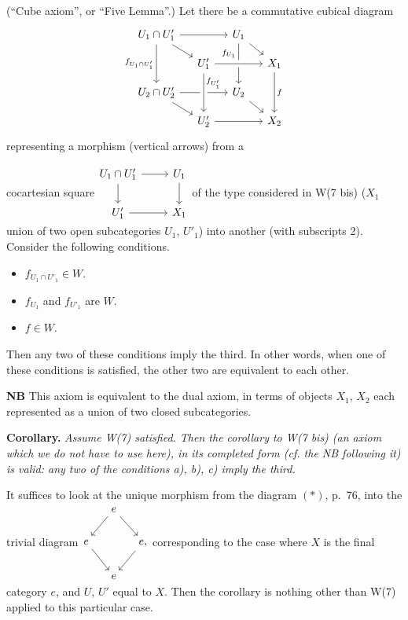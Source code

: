 \begin{description}[leftmargin=5em, style=sameline]
\item[W(7)] (``Cube axiom'', or ``Five Lemma''.) Let there be a commutative cubical diagram
\[
\begin{tikzcd}[row sep=small, column sep=small]
U_1\cap U'_1 \arrow[rr] \arrow[dr] \arrow[dd, "f_{U_1\cap U'_1}"'] & & U_1 \arrow[dr] \arrow[dd, "f_{U_1}"{swap,pos=.25}] & \\
& U'_1 \arrow[rr, crossing over] & & X_1 \arrow[dd, "f"] \\
U_2\cap U'_2 \arrow[rr] \arrow[dr] & & U_2 \arrow[dr] & \\
& U'_2 \arrow[rr] \arrow[from=uu, crossing over, "f_{U'_1}"{pos=.25}] & & X_2
\end{tikzcd}
\]
representing a morphism (vertical arrows) from a

cocartesian square\quad $\vcenter{\hbox{\begin{tikzcd}
U_1\cap U'_1 \arrow[r] \arrow[d] & U_1 \arrow[d] \\
U'_1 \arrow[r] & X_1
\end{tikzcd}}}$\quad of the type considered in W(7 bis) ($X_1$ union of two open subcategories $U_1$, $U'_1$) into another (with subscripts 2). Consider the following conditions.

\begin{itemize}
\item[a)] $f_{U_1\cap U'_1}\in W$.
\item[b)] $f_{U_1}$ and $f_{U'_1}$ are $W$.
\item[c)] $f\in W$.
\end{itemize}

Then any two of these conditions imply the third. In other words, when one of these conditions is satisfied, the other two are equivalent to each other.
\end{description}

\textbf{NB} This axiom is equivalent to the dual axiom, in terms of objects $X_1$, $X_2$ each represented as a union of two closed subcategories.

\textbf{Corollary.} \textit{Assume \textup{W(7)} satisfied. Then the corollary to \textup{W(7 bis)} (an axiom which we do not have to use here), in its completed form (cf. the NB following it) is valid: any two of the conditions a), b), c) imply the third.}

It suffices to look at the unique morphism from the diagram $(*)$, p.~76, into the trivial diagram\quad $\vcenter{\hbox{\begin{tikzcd}[column sep=small]
& e \arrow[dl] \arrow[dr] & \\
e \arrow[dr] & & e, \arrow[dl] \\
& e &
\end{tikzcd}}}$\quad corresponding to the case where $X$ is the final category $e$, and $U$, $U'$ equal to $X$. Then the corollary is nothing other than W(7) applied to this particular case.

